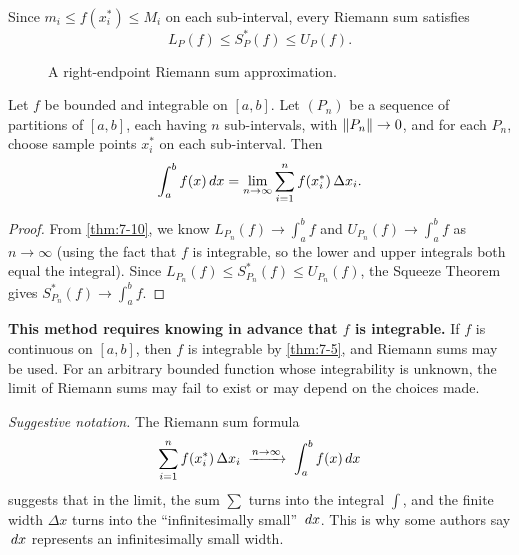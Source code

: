 \begin{remark}
Since $m_i \le f(x_i^{*}) \le M_i$ on each sub-interval, every Riemann sum satisfies
\[
  L_P(f) \le S_P^{*}(f) \le U_P(f).
\]
\end{remark}

\begin{figure}[ht]
  \centering
  
  \caption{A right-endpoint Riemann sum approximation.}
  \label{fig:riemann-rectangles}
\end{figure}

\begin{theorem}
\label{thm:7-11}
Let $f$ be bounded and integrable on $[a,b]$.  Let $(P_n)$ be a sequence of partitions of $[a,b]$, each having $n$ sub-intervals, with $\left\lVert P_n \right\rVert \to 0$, and for each $P_n$, choose sample points $x_i^{*}$ on each sub-interval.  Then
\[
  \int_{a}^{b} f(x)\,dx = \lim_{n \to \infty} \sum_{i=1}^{n} f(x_i^{*})\,\Delta x_i.
\]
\end{theorem}

\begin{proof}
From \cref{thm:7-10}, we know $L_{P_n}(f) \to \displaystyle\int_{a}^{b} f$ and $U_{P_n}(f) \to \displaystyle\int_{a}^{b} f$ as $n \to \infty$ (using the fact that $f$ is integrable, so the lower and upper integrals both equal the integral).  Since $L_{P_n}(f) \le S_{P_n}^{*}(f) \le U_{P_n}(f)$, the Squeeze Theorem gives $S_{P_n}^{*}(f) \to \displaystyle\int_{a}^{b} f$.
\end{proof}

\begin{remark}[Warning]
\textbf{This method requires knowing in advance that $f$ is integrable.}  If $f$ is continuous on $[a,b]$, then $f$ is integrable by \cref{thm:7-5}, and Riemann sums may be used.  For an arbitrary bounded function whose integrability is unknown, the limit of Riemann sums may fail to exist or may depend on the choices made.
\end{remark}

\textit{Suggestive notation.}  The Riemann sum formula
\[
  \sum_{i=1}^{n} f(x_i^{*})\,\Delta x_i \;\xrightarrow{n\to\infty}\; \int_{a}^{b} f(x)\,dx
\]
suggests that in the limit, the sum $\displaystyle\sum$ turns into the integral $\displaystyle\int$, and the finite width $\Delta x$ turns into the ``infinitesimally small'' $\,dx$.  This is why some authors say $\,dx$ represents an infinitesimally small width.

